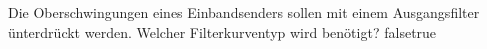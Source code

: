     {Die Oberschwingungen eines Einbandsenders sollen mit einem Ausgangsfilter ünterdrückt werden. Welcher Filterkurventyp wird benötigt?}
    {}
    {}
    {}
    {}
    {false}{true}